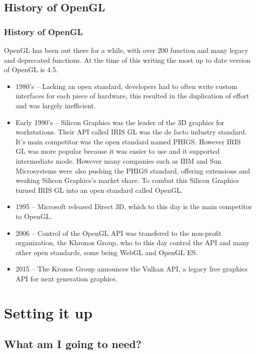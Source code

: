 \documentclass{beamer}
\begin{document}
          \subsection{History of OpenGL}
          \begin{frame}
            \frametitle{History of OpenGL}
            OpenGL has been out there for a while, with over 200 function and many legacy and deprecated functions. At the time of this writing the most up to date version of OpenGL is 4.5.
            \begin{scriptsize}
              \begin{itemize}
              \item 1980's -- Lacking an open standard, developers had to often write custom interfaces for each piece of hardware, this resulted in the duplication of effort and was largely inefficient.  
              \item Early 1990's -- Silicon Graphics was the leader of the 3D graphics for workstations. Their API called IRIS GL was the de facto industry standard. It's main competitor was the open standard named PHIGS. However IRIS GL was more popular because it was easier to use and it supported intermediate mode. However many companies such as IBM and Sun Microsystems were also pushing the PHIGS standard, offering extensions and weaking Silicon Graphics's market share. To combat this Silicon Graphics turned IRIS GL into an open standard called OpenGL.
              \item 1995 -- Microsoft released Direct 3D, which to this day is the main competitor to OpenGL.
              \item 2006 -- Control of the OpenGL API was transfered to the non-profit organization, the Khronos Group, who to this day control the API and many other open standards, some being WebGL and OpenGL ES.
              \item 2015 -- The Kronos Group announces the Vulkan API, a legacy free graphics API for next generation graphics.
              \end{itemize}
            \end{scriptsize}

          \end{frame}

          \section{Setting it up}
          \subsection{What am I going to need?}
\end{document}
